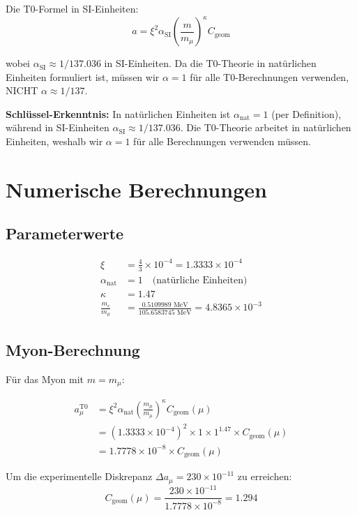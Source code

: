 \documentclass[12pt,a4paper]{article}
\newcommand{\xipar}{\xi}
\newcommand{\alphaSI}{\alpha_{\text{SI}}}
\newcommand{\alphaNAT}{\alpha_{\text{nat}}}
\newcommand{\Cgeom}{C_{\text{geom}}}
\newcommand{\kappaT}{\kappa}
\newcommand{\mmu}{m_{\mu}}
\newcommand{\melec}{m_{e}}
\begin{document}
	Die T0-Formel in SI-Einheiten:
	\begin{equation}
		a = \xipar^2 \alphaSI \left(\frac{m}{\mmu}\right)^{\kappaT} \Cgeom
	\end{equation}
	
	wobei $\alphaSI \approx 1/137.036$ in SI-Einheiten. Da die T0-Theorie in natürlichen Einheiten formuliert ist, müssen wir $\alpha = 1$ für alle T0-Berechnungen verwenden, NICHT $\alpha \approx 1/137$.
	
	\textbf{Schlüssel-Erkenntnis:} In natürlichen Einheiten ist $\alphaNAT = 1$ (per Definition), während in SI-Einheiten $\alphaSI \approx 1/137.036$. Die T0-Theorie arbeitet in natürlichen Einheiten, weshalb wir $\alpha = 1$ für alle Berechnungen verwenden müssen.
	
	\section{Numerische Berechnungen}
	
	\subsection{Parameterwerte}
	
	\begin{align}
		\xipar &= \frac{4}{3} \times 10^{-4} = 1.3333 \times 10^{-4} \\
		\alphaNAT &= 1 \quad \text{(natürliche Einheiten)} \\
		\kappaT &= 1.47 \\
		\frac{\melec}{\mmu} &= \frac{0.5109989 \text{ MeV}}{105.6583745 \text{ MeV}} = 4.8365 \times 10^{-3}
	\end{align}
	
	\subsection{Myon-Berechnung}
	
	Für das Myon mit $m = \mmu$:
	
	\begin{align}
		a_\mu^{\text{T0}} &= \xipar^2 \alphaNAT \left(\frac{\mmu}{\mmu}\right)^{\kappaT} \Cgeom(\mu) \\
		&= (1.3333 \times 10^{-4})^2 \times 1 \times 1^{1.47} \times \Cgeom(\mu) \\
		&= 1.7778 \times 10^{-8} \times \Cgeom(\mu)
	\end{align}
	
	Um die experimentelle Diskrepanz $\Delta a_\mu = 230 \times 10^{-11}$ zu erreichen:
	\begin{equation}
		\Cgeom(\mu) = \frac{230 \times 10^{-11}}{1.7778 \times 10^{-8}} = 1.294
	\end{equation}
	
\end{document}
